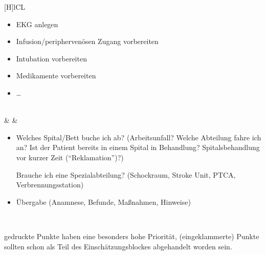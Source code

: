 {\begin{minipage}{\linewidth}
{\begin{tabulary}{\linewidth}[H]{lCL}
\begin{minipage}{\linewidth}
\begin{itemize}
  \item EKG anlegen
  \item Infusion/periphervenösen Zugang vorbereiten
  \item Intubation vorbereiten
  \item Medikamente vorbereiten
  \item \ldots
\end{itemize}
\end{minipage}
\\\addlinespace\midrule\addlinespace
{}
&
&
\begin{minipage}{\linewidth}
\begin{itemize}
  \item Welches Spital/Bett buche ich ab? {\tiny(Arbeitsunfall?
  Welche Abteilung fahre ich an? Ist der Patient bereits in
  einem Spital in Behandlung? Spitalsbehandlung vor kurzer
  Zeit (\enquote{Reklamation})?)}
  
  Brauche ich eine Spezialabteilung? {\tiny(Schockraum, Stroke
  Unit, PTCA, Verbrennungsstation)}
  \item Übergabe {\tiny(Anamnese, Befunde, Maßnahmen, Hinweise)}
\end{itemize}
\end{minipage}

\\\addlinespace\bottomrule
\end{tabulary}}

{\scriptsize{} gedruckte Punkte haben eine besonders hohe Priorität, (eingeklammerte) Punkte sollten schon als Teil des Einschätzungsblockes abgehandelt worden sein.}
\end{minipage}
}%
{}%

\clearpage

\section{}
